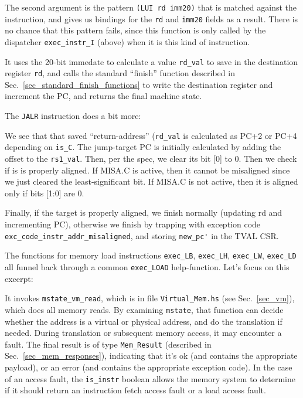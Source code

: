 \documentclass[11pt]{article}
\begin{document}
The second argument is the pattern \verb|(LUI rd imm20)| that is
matched against the instruction, and gives us bindings for the
\verb|rd| and \verb|imm20| fields as a result.  There is no chance
that this pattern fails, since this function is only called by the
dispatcher \verb|exec_instr_I| (above) when it is this kind of
instruction.

It uses the 20-bit immedate to calculate a value \verb|rd_val| to save
in the destination register \verb|rd|, and calls the standard
``finish'' function described in
Sec.~\ref{sec_standard_finish_functions} to write the destination
register and increment the PC, and returns the final machine state.


The \verb|JALR| instruction does a bit more:



We see that that saved ``return-address'' (\verb|rd_val| is calculated
as PC+2 or PC+4 depending on \verb|is_C|.  The jump-target PC is
initially calculated by adding the offset to the \verb|rs1_val|.
Then, per the spec, we clear its bit [0] to 0.  Then we check if is is
properly aligned. If MISA.C is active, then it cannot be misaligned
since we just cleared the least-significant bit.  If MISA.C is not
active, then it is aligned only if bits [1:0] are 0.

Finally, if the target is properly aligned, we finish normally
(updating rd and incrementing PC), otherwise we finish by trapping
with exception code \verb|exc_code_instr_addr_misaligned|, and storing
\verb|new_pc'| in the TVAL CSR.

The functions for memory load instructions \verb|exec_LB|,
\verb|exec_LH|, \verb|exec_LW|, \verb|exec_LD| all funnel back through
a common \verb|exec_LOAD| help-function.  Let's focus on this excerpt:



It invokes \verb|mstate_vm_read|, which is in file
\verb|Virtual_Mem.hs| (see Sec.~\ref{sec_vm}), which does all memory
reads.  By examining \verb|mstate|, that function can decide whether
the address is a virtual or physical address, and do the translation
if needed.  During translation or subsequent memory access, it may
encounter a fault.  The final result is of type \verb|Mem_Result|
(described in Sec.~\ref{sec_mem_responses}), indicating that it's ok
(and contains the appropriate payload), or an error (and contains the
appropriate exception code).  In the case of an access fault, the
\verb|is_instr| boolean allows the memory system to determine if it
should return an instruction fetch access fault or a load access
fault.
\end{document}
